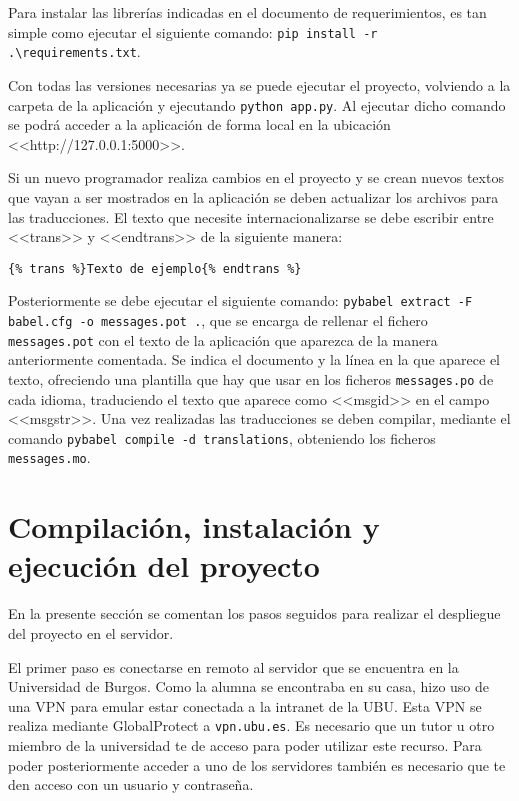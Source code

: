 Para instalar las librerías indicadas en el documento de requerimientos, es tan simple como ejecutar el siguiente comando: \texttt{pip install -r .\textbackslash requirements.txt}.

Con todas las versiones necesarias ya se puede ejecutar el proyecto, volviendo a la carpeta de la aplicación y ejecutando \texttt{python app.py}.
Al ejecutar dicho comando se podrá acceder a la aplicación de forma local en la ubicación <<http://127.0.0.1:5000>>.


Si un nuevo programador realiza cambios en el proyecto y se crean nuevos textos que vayan a ser mostrados en la aplicación se deben actualizar los archivos para las traducciones. El texto que necesite internacionalizarse se debe escribir entre <<trans>> y <<endtrans>> de la siguiente manera: \begin{verbatim}
{% trans %}Texto de ejemplo{% endtrans %}
\end{verbatim}

Posteriormente se debe ejecutar el siguiente comando: \texttt{pybabel extract -F babel.cfg -o messages.pot .}, que se encarga de rellenar el fichero \texttt{messages.pot} con el texto de la aplicación que aparezca de la manera anteriormente comentada. Se indica el documento y la línea en la que aparece el texto, ofreciendo una plantilla que hay que usar en los ficheros \texttt{messages.po} de cada idioma, traduciendo el texto que aparece como <<msgid>> en el campo <<msgstr>>. Una vez realizadas las traducciones se deben compilar, mediante el comando \texttt{pybabel compile -d translations}, obteniendo los ficheros \texttt{messages.mo}.




\section{Compilación, instalación y ejecución del proyecto} 
En la presente sección se comentan los pasos seguidos para realizar el despliegue del proyecto en el servidor.

El primer paso es conectarse en remoto al servidor que se encuentra en la Universidad de Burgos. Como la alumna se encontraba en su casa, hizo uso de una VPN para emular estar conectada a la intranet de la UBU. Esta VPN se realiza mediante GlobalProtect a \texttt{vpn.ubu.es}. Es necesario que un tutor u otro miembro de la universidad te de acceso para poder utilizar este recurso. Para poder posteriormente acceder a uno de los servidores también es necesario que te den acceso con un usuario y contraseña.

